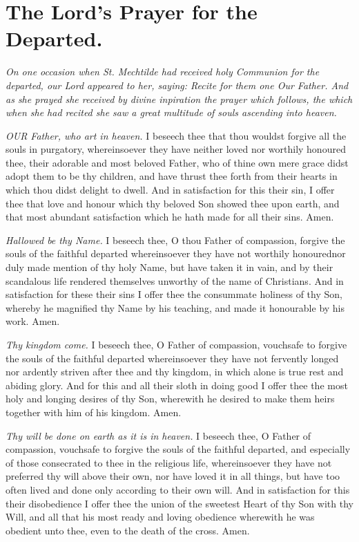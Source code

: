 \documentclass[a5paper,12pt]{memoir}
\begin{document}
\section{The Lord's Prayer for the Departed.}

\emph{On one occasion when 
St. Mechtilde had received holy Communion 
for the departed, our 
Lord appeared to her, 
saying: Recite for them 
one \emph{Our Father}. And 
as she prayed she received by divine inpiration the prayer which 
follows, the which when 
she had recited she saw 
a great multitude of 
souls ascending into 
heaven.} 

\emph{OUR Father, who art in heaven.} I 
beseech thee that 
thou wouldst forgive 
all the souls in purgatory, whereinsoever 
they have neither loved 
nor worthily honoured thee, their adorable 
and most beloved Father, who of thine 
own mere grace didst 
adopt them to be thy 
children, and have 
thrust thee forth from 
their hearts in which 
thou didst delight to 
dwell. And in satisfaction for this their 
sin, I offer thee that 
love and honour which 
thy beloved Son showed thee upon earth, 
and that most abundant satisfaction which 
he hath made for all 
their sins. Amen. 

\emph{Hallowed be thy 
Name.} I beseech 
thee, O thou Father 
of compassion, forgive 
the souls of the faithful departed whereinsoever they have not 
worthily honourednor 
duly made mention of 
thy holy Name, but 
have taken it in vain, 
and by their scandalous life rendered 
themselves unworthy 
of the name of Christians. And in satisfaction for these their 
sins I offer thee the 
consummate holiness 
of thy Son, whereby he 
magnified thy Name 
by his teaching, and 
made it honourable by 
his work. Amen. 

\emph{Thy kingdom come.}
I beseech thee, O Father of compassion, 
vouchsafe to forgive 
the souls of the faithful departed whereinsoever they have not 
fervently longed nor 
ardently striven after 
thee and thy kingdom, in which alone 
is true rest and abiding glory. And for 
this and all their sloth 
in doing good I offer 
thee the most holy 
and longing desires 
of thy Son, wherewith 
he desired to make 
them heirs together 
with him of his kingdom. Amen. 

\emph{Thy will be done on 
earth as it is in heaven.} I beseech thee, 
O Father of compassion, vouchsafe to forgive the souls of the 
faithful departed, and 
especially of those 
consecrated to thee 
in the religious life, 
whereinsoever they 
have not preferred thy 
will above their own, 
nor have loved it in 
all things, but have 
too often lived and 
done only according to 
their own will. And 
in satisfaction for this 
their disobedience I 
offer thee the union 
of the sweetest Heart 
of thy Son with thy 
Will, and all that his 
most ready and loving obedience wherewith he was obedient 
unto thee, even to the 
death of the cross. 
Amen. 
\end{document}

